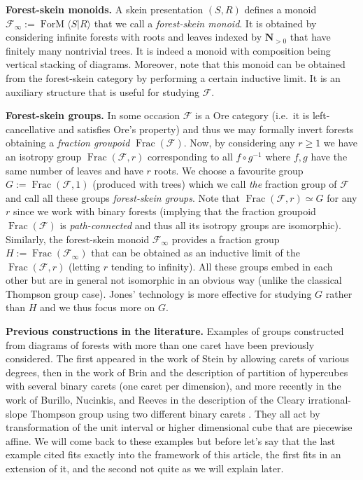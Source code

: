 \documentclass[a4paper, 12pt]{amsart}
\numberwithin{equation}{section}
\theoremstyle{definition}
\newcommand{\cF}{\mathcal F}
\DeclareMathOperator{\Frac}{Frac}
\DeclareMathOperator{\FM}{ForM}
\newcommand{\la}{\langle}
\newcommand{\N}{\mathbf{N}}
\newcommand{\ra}{\rangle}
\begin{document}
{\bf Forest-skein monoids.}
A skein presentation $(S,R)$ defines a monoid $\cF_\infty:=\FM\la S|R\ra$ that we call a {\it forest-skein monoid}.
It is obtained by considering infinite forests with roots and leaves indexed by $\N_{>0}$ that have finitely many nontrivial trees.
It is indeed a monoid with composition being vertical stacking of diagrams.
Moreover, note that this monoid can be obtained from the forest-skein category by performing a certain inductive limit.
It is an auxiliary structure that is useful for studying $\cF$.

{\bf Forest-skein groups.}
In some occasion $\cF$ is a Ore category (i.e.~it is left-cancellative and satisfies Ore's property) and thus we may formally invert forests obtaining a {\it fraction groupoid} $\Frac(\cF)$.
Now, by considering any $r\geq 1$ we have an isotropy group $\Frac(\cF,r)$ corresponding to all $f\circ g^{-1}$ where $f,g$ have the same number of leaves and have $r$ roots.
We choose a favourite group $G:=\Frac(\cF,1)$ (produced with trees) which we call {\it the} fraction group of $\cF$ and call all these groups {\it forest-skein groups}.
Note that $\Frac(\cF,r)\simeq G$ for any $r$ since we work with binary forests (implying that the fraction groupoid $\Frac(\cF)$ is {\it path-connected} and thus all its isotropy groups are isomorphic).
Similarly, the forest-skein monoid $\cF_\infty$ provides a fraction group $H:=\Frac(\cF_\infty)$ that can be obtained as an inductive limit of the $\Frac(\cF,r)$ (letting $r$ tending to infinity).
All these groups embed in each other but are in general not isomorphic in an obvious way (unlike the classical Thompson group case).
Jones' technology is more effective for studying $G$ rather than $H$ and we thus focus more on $G$.

{\bf Previous constructions in the literature.} 
Examples of groups constructed from diagrams of forests with more than one caret have been previously considered. 
The first appeared in the work of Stein by allowing carets of various degrees, then in the work of Brin and the description of partition of hypercubes with several binary carets (one caret per dimension), and more recently in the work of Burillo, Nucinkis, and Reeves in the description of the Cleary irrational-slope Thompson group using two different binary carets \cite{Stein92,Brin-dV1, Burillo-Nucinkis-Reeves21}. 
They all act by transformation of the unit interval or higher dimensional cube that are piecewise affine.
We will come back to these examples but before let's say that the last example cited fits exactly into the framework of this article, the first fits in an extension of it, and the second not quite as we will explain later. 
\end{document}
